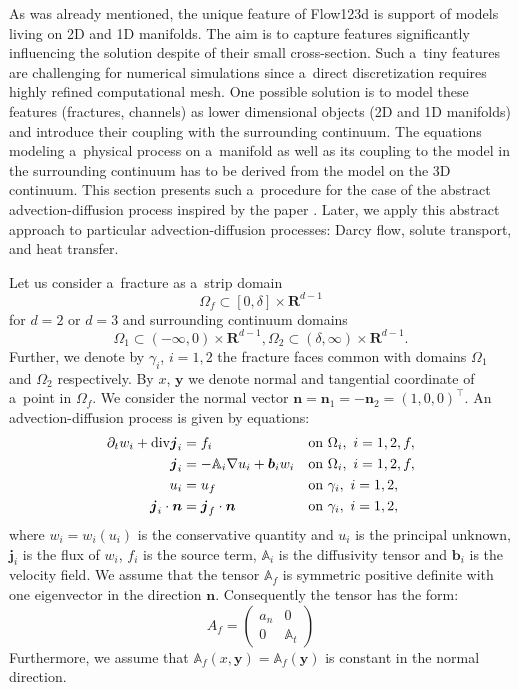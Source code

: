 \documentclass[12pt,a4paper]{report}
\def\prtl{\partial}
\def\vc#1{\mathbf{\boldsymbol{#1}}}     %
\def\tn#1{{\mathbb{#1}}}    %
\def\div{{\rm div}}
\def\grad{\nabla}
\def\Real{{\mathbf R}}
\begin{document}
As was already mentioned, the unique feature of Flow123d is support of models living on 2D and 1D manifolds. The aim is to capture 
features significantly influencing the solution despite of their small cross-section. Such a~tiny features are
challenging for numerical simulations since a~direct discretization requires highly refined
computational mesh. One possible solution is to model these features (fractures, channels) 
as lower dimensional objects (2D and 1D manifolds) and introduce their coupling with the surrounding continuum.
The equations modeling a~physical process on a~manifold as well as its coupling to the model in the surrounding continuum
has to be derived from the model on the 3D continuum. This section presents such a~procedure for the case of the abstract
advection-diffusion process inspired by the paper \cite{martin_modeling_2005}. Later, we apply this abstract approach to 
particular advection-diffusion processes: Darcy flow, solute transport, and heat transfer.

Let us consider a~fracture as a~strip domain 
\[
 \Omega_f \subset [0,\delta] \times \Real^{d-1}
\]
for $d=2$ or $d=3$ and surrounding continuum domains
\[
 \Omega_1 \subset (-\infty,0)\times \Real^{d-1},
 \Omega_2 \subset (\delta,\infty)\times \Real^{d-1}.
\]
Further, we denote by $\gamma_i$, $i=1,2$ the fracture faces common with domains $\Omega_1$ and $\Omega_2$ respectively.
By $x$, $\vc y$ we denote normal and tangential coordinate of a~point in $\Omega_f$. 
We consider the normal vector  $\vc n=\vc n_1=-\vc n_2=(1,0,0)^\top$.
An advection-diffusion process is given by equations:
\begin{align}
  \label{eq:fr:continuity}
  \prtl_t w_i + \div \vc j_i &= f_i&&  \text{on } \Omega_i,\ i=1,2,f,\\
  \label{eq:fr:flux}
  \vc j_i &= - \tn A_i\grad u_i + \vc b_i w_i&& \text{on } \Omega_i,\ i=1,2,f,\\
  \label{eq:fr:Dirichlet}
  u_i &= u_f&& \text{on } \gamma_i,\ i=1,2,\\
  \label{eq:fr:Neumann}
  \vc j_i \cdot \vc n &= \vc j_f \cdot \vc n&& \text{on } \gamma_i,\ i=1,2,
\end{align}
where $w_i=w_i(u_i)$ is the conservative quantity and $u_i$ is the principal unknown, $\vc j_i$ is the flux of $w_i$, $f_i$ is the source term,
$\tn A_i$ is the diffusivity tensor and $\vc b_i$ is the velocity field. We assume that the tensor $\tn A_f$ is symmetric positive definite 
with one eigenvector in the direction $\vc n$. Consequently the tensor has the form:
\[
 A_f = \begin{pmatrix} 
            a_n & 0  \\
            0 & \tn A_t
       \end{pmatrix}
\]
Furthermore, we assume that $\tn A_f(x, \vc y)=\tn A_f(\vc y)$ is constant in the normal direction.
\end{document}
